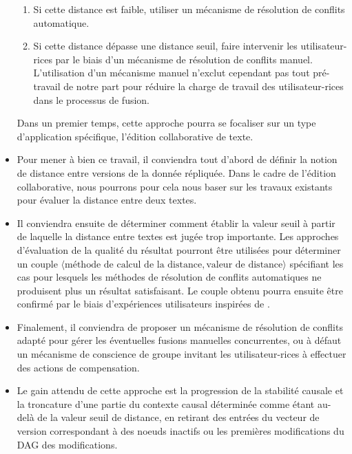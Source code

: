 \begin{itemize}
        \begin{enumerate}
            \item Si cette distance est faible, utiliser un mécanisme de résolution de conflits automatique.
            \item Si cette distance dépasse une distance seuil, faire intervenir les utilisateur-rices par le biais d'un mécanisme de résolution de conflits manuel.
                L'utilisation d'un mécanisme manuel n'exclut cependant pas tout pré-travail de notre part pour réduire la charge de travail des utilisateur-rices dans le processus de fusion.
        \end{enumerate}
        Dans un premier temps, cette approche pourra se focaliser sur un type d'application spécifique, \eg l'édition collaborative de texte.
    \item Pour mener à bien ce travail, il conviendra tout d'abord de définir la notion de distance entre versions de la donnée répliquée.
        Dans le cadre de l'édition collaborative, nous pourrons pour cela nous baser sur les travaux existants pour évaluer la distance entre deux textes.
    \item Il conviendra ensuite de déterminer comment établir la valeur seuil à partir de laquelle la distance entre textes est jugée trop importante.
        Les approches d'évaluation de la qualité du résultat pourront être utilisées pour déterminer un couple $\langle \text{méthode de calcul de la distance}, \text{valeur de distance} \rangle$ spécifiant les cas pour lesquels les méthodes de résolution de conflits automatiques ne produisent plus un résultat satisfaisant.
        Le couple obtenu pourra ensuite être confirmé par le biais d'expériences utilisateurs inspirées de \cite{2014-effect-delay-collaborative-editing-ignat,2015-cope-delay-collaborative-note-taking-ignat}.
    \item Finalement, il conviendra de proposer un mécanisme de résolution de conflits adapté pour gérer les éventuelles fusions manuelles concurrentes, ou à défaut un mécanisme de conscience de groupe invitant les utilisateur-rices à effectuer des actions de compensation.
    \item Le gain attendu de cette approche est la progression de la stabilité causale et la troncature d'une partie du contexte causal déterminée comme étant au-delà de la valeur seuil de distance, \eg en retirant des entrées du vecteur de version correspondant à des noeuds inactifs ou les premières modifications du \ac{DAG} des modifications.
\end{itemize}

